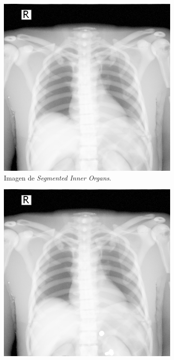 \begin{figure}[h]
\begin{subfigure}[b]{0.3\linewidth}
        \centering
\includegraphics[width=\linewidth]{IMG/HVPForeign.png}
        \caption{Imagen  de \emph{Segmented Inner Organs}\cite{VoxelMan}.}
    \end{subfigure}
    \null\hfill
    \begin{subfigure}[b]{0.3\linewidth}
        \centering
        {\includegraphics[width=\linewidth]{IMG/HVPNormal.png}}

\end{subfigure}
\end{figure}
